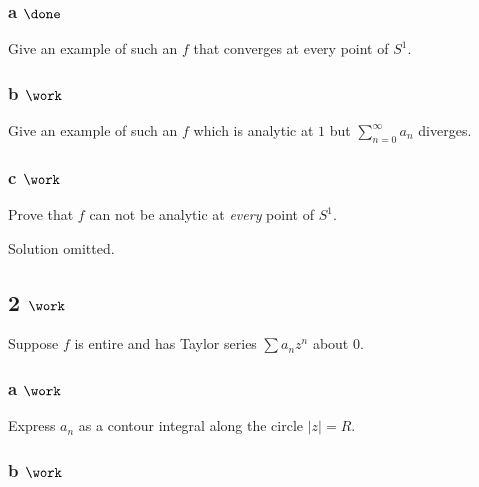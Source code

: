 \hypertarget{a-done}{%
\subsubsection{\texorpdfstring{a
\(\done\)}{a \textbackslash done}}\label{a-done}}

Give an example of such an \(f\) that converges at every point of
\(S^1\).

\hypertarget{b-work-3}{%
\subsubsection{\texorpdfstring{b
\(\work\)}{b \textbackslash work}}\label{b-work-3}}

Give an example of such an \(f\) which is analytic at \(1\) but
\(\sum_{n=0}^\infty a_n\) diverges.

\hypertarget{c-work-3}{%
\subsubsection{\texorpdfstring{c
\(\work\)}{c \textbackslash work}}\label{c-work-3}}

Prove that \(f\) can not be analytic at \emph{every} point of \(S^1\).


Solution omitted.

\hypertarget{work-23}{%
\subsection{\texorpdfstring{2
\(\work\)}{2 \textbackslash work}}\label{work-23}}

Suppose \(f\) is entire and has Taylor series \(\sum a_n z^n\) about 0.

\hypertarget{a-work-3}{%
\subsubsection{\texorpdfstring{a
\(\work\)}{a \textbackslash work}}\label{a-work-3}}

Express \(a_n\) as a contour integral along the circle
\({\left\lvert {z} \right\rvert} = R\).

\hypertarget{b-work-5}{%
\subsubsection{\texorpdfstring{b
\(\work\)}{b \textbackslash work}}\label{b-work-5}}

